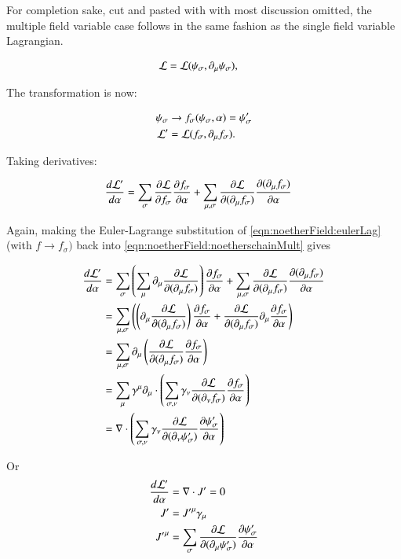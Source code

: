 For completion sake, cut and pasted with with most discussion omitted, 
the multiple field variable case follows in the same fashion
as the single field variable Lagrangian.

\begin{align*}
\mathcal{L} &= \mathcal{L}(\psi_\sigma, \partial_\mu \psi_\sigma),
\end{align*}

The transformation is now:

\begin{align*}
\psi_\sigma &\rightarrow f_\sigma(\psi_\sigma, \alpha) = \psi_\sigma' \\
\mathcal{L}' &= \mathcal{L}(f_\sigma, \partial_\mu f_\sigma).
\end{align*}

Taking derivatives:

\begin{align}\label{eqn:noetherField:noetherschainMult}
\frac{d\mathcal{L}'}{d\alpha}
&= \sum_\sigma \frac{\partial {\mathcal{L}}}{\partial {f_\sigma}}\frac{\partial {f_\sigma}}{\partial {\alpha}} + \sum_{\mu,\sigma} \frac{\partial {\mathcal{L}}}{\partial {(\partial_\mu f_\sigma)}}\frac{\partial {(\partial_\mu f_\sigma)}}{\partial {\alpha}}
\end{align}

Again, making the Euler-Lagrange substitution of \ref{eqn:noetherField:eulerLag} (with $f\rightarrow f_\sigma)$ back into \ref{eqn:noetherField:noetherschainMult} gives

\begin{align*}
\frac{d\mathcal{L}'}{d\alpha}
&= 
\sum_\sigma \left( \sum_\mu \partial_\mu \frac{\partial {\mathcal{L}}}{\partial {(\partial_\mu f_\sigma)}}\right)
\frac{\partial {f_\sigma}}{\partial {\alpha}} + \sum_{\mu,\sigma} \frac{\partial {\mathcal{L}}}{\partial {(\partial_\mu f_\sigma)}}\frac{\partial {(\partial_\mu f_\sigma)}}{\partial {\alpha}} \\
&= 
\sum_{\mu,\sigma} \left( \left( \partial_\mu \frac{\partial {\mathcal{L}}}{\partial {(\partial_\mu f_\sigma)}} \right)
\frac{\partial {f_\sigma}}{\partial {\alpha}} + \frac{\partial {\mathcal{L}}}{\partial {(\partial_\mu f_\sigma)}} \partial_\mu \frac{\partial {f_\sigma}}{\partial {\alpha}} \right) \\
&= \sum_{\mu,\sigma} \partial_\mu \left( \frac{\partial {\mathcal{L}}}{\partial {(\partial_\mu f_\sigma)}} \frac{\partial {f_\sigma}}{\partial {\alpha}} \right) \\
&= \sum_\mu \gamma^\mu \partial_\mu \cdot \left( \sum_{\sigma,\nu} \gamma_\nu \frac{\partial {\mathcal{L}}}{\partial {(\partial_\nu f_\sigma)}} \frac{\partial {f_\sigma}}{\partial {\alpha}} \right) \\
&= \nabla \cdot \left( \sum_{\sigma,\nu} \gamma_\nu \frac{\partial {\mathcal{L}}}{\partial {(\partial_\nu \psi_\sigma')}} \frac{\partial {\psi_\sigma'}}{\partial {\alpha}} \right) \\
\end{align*}

Or
\begin{align}\label{eqn:noetherField:conCurrent}
\frac{d \mathcal{L}'}{d\alpha} &= \nabla \cdot J' = 0 \\
J' &= {J'}^\mu \gamma_\mu \\
{J'}^\mu &= \sum_\sigma \frac{\partial {\mathcal{L}}}{\partial {(\partial_\mu \psi_\sigma')}} \frac{\partial {\psi_\sigma'}}{\partial {\alpha}} 
\end{align}

